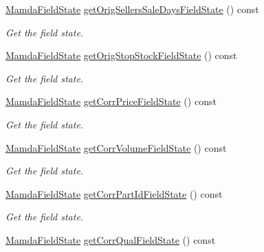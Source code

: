\begin{CompactItemize}
\hyperlink{namespaceWombat_93aac974f2ab713554fd12a1fa3b7d2a}{Mamda\-Field\-State} \hyperlink{classWombat_1_1MamdaTradeListener_e4e53df493af564fb26c91e1cf6f0a0e}{get\-Orig\-Sellers\-Sale\-Days\-Field\-State} () const 
\begin{CompactList}\small\item\em Get the field state. \item\end{CompactList}\item 
\hyperlink{namespaceWombat_93aac974f2ab713554fd12a1fa3b7d2a}{Mamda\-Field\-State} \hyperlink{classWombat_1_1MamdaTradeListener_f877c87cdd8ba3db4e1c41f8465ed249}{get\-Orig\-Stop\-Stock\-Field\-State} () const 
\begin{CompactList}\small\item\em Get the field state. \item\end{CompactList}\item 
\hyperlink{namespaceWombat_93aac974f2ab713554fd12a1fa3b7d2a}{Mamda\-Field\-State} \hyperlink{classWombat_1_1MamdaTradeListener_08793314284873b5ff94b2f94934cb0b}{get\-Corr\-Price\-Field\-State} () const 
\begin{CompactList}\small\item\em Get the field state. \item\end{CompactList}\item 
\hyperlink{namespaceWombat_93aac974f2ab713554fd12a1fa3b7d2a}{Mamda\-Field\-State} \hyperlink{classWombat_1_1MamdaTradeListener_90012157ba9cf5464d9e03e7a9af9e07}{get\-Corr\-Volume\-Field\-State} () const 
\begin{CompactList}\small\item\em Get the field state. \item\end{CompactList}\item 
\hyperlink{namespaceWombat_93aac974f2ab713554fd12a1fa3b7d2a}{Mamda\-Field\-State} \hyperlink{classWombat_1_1MamdaTradeListener_f6fa0ee1c2489746e1ee0bd5a6560d07}{get\-Corr\-Part\-Id\-Field\-State} () const 
\begin{CompactList}\small\item\em Get the field state. \item\end{CompactList}\item 
\hyperlink{namespaceWombat_93aac974f2ab713554fd12a1fa3b7d2a}{Mamda\-Field\-State} \hyperlink{classWombat_1_1MamdaTradeListener_daad2759f93458592e1c984b983443bd}{get\-Corr\-Qual\-Field\-State} () const 

\end{CompactItemize}
